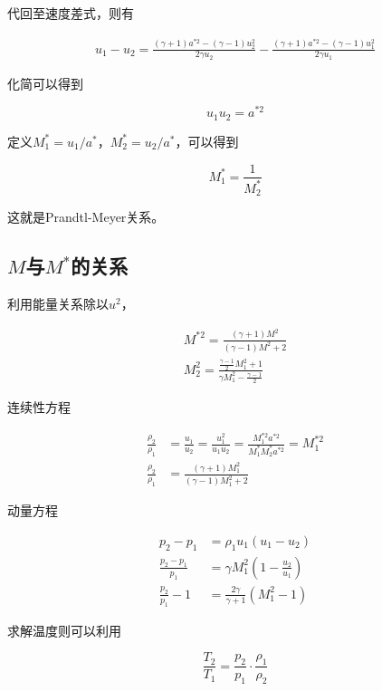 代回至速度差式，则有

\begin{gather*}
    u_{1}-u_{2}=\frac{(\gamma+1) a^{* 2}-(\gamma-1) u_{2}^{2}}{2 \gamma u_{2}}-\frac{(\gamma+1) a^{* 2}-(\gamma-1) u_{1}^{2}}{2 \gamma u_{1}}
\end{gather*}

化简可以得到

\begin{equation*}
    u_{1} u_{2}=a^{* 2}
\end{equation*}

定义$M_{1}^{*}=u_{1} / a^{*}$，$M_{2}^{*}=u_{2} / a^{*}$，可以得到

\begin{equation*}
    M_{1}^{*}=\frac{1}{M_{2}^{*}}
\end{equation*}

这就是Prandtl-Meyer关系。

\subsection{$M$与$M^*$的关系}

利用能量关系除以$u^2$，

\begin{gather*}
    M^{* 2}=\frac{(\gamma+1) M^{2}}{(\gamma-1) M^{2}+2}\\ 
    M_{2}^{2}=\frac{\frac{\gamma-1}{2} M_{1}^{2}+1}{\gamma M_{1}^{2}-\frac{\gamma-1}{2}}
\end{gather*}

连续性方程

\begin{align*}
    \frac{\rho_2}{\rho_1}&=\frac{u_1}{u_2}=\frac{u_1^2}{u_1u_2}=\frac{M_1^{*2}a^{*2}}{M_1^*M_2^*a^{*2}}=M_1^{*2}\\ 
    \frac{\rho_{2}}{\rho_{1}}&=\frac{(\gamma+1) M_{1}^{2}}{(\gamma-1) M_{1}^{2}+2}
\end{align*}

动量方程

\begin{align*}
    p_{2}-p_{1}&=\rho_{1} u_{1}\left(u_{1}-u_{2}\right)\\ 
    \frac{p_{2}-p_{1}}{p_{1}}&=\gamma M_{1}^{2}\left(1-\frac{u_{2}}{u_{1}}\right)\\ 
    \frac{p_{2}}{p_{1}}-1&=\frac{2 \gamma}{\gamma+1}\left(M_{1}^{2}-1\right)
\end{align*}

求解温度则可以利用

\begin{equation*}
    \frac{T_{2}}{T_{1}}=\frac{p_{2}}{p_{1}} \cdot \frac{\rho_{1}}{\rho_{2}}
\end{equation*}